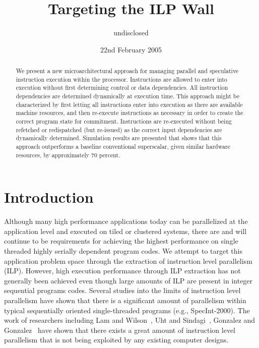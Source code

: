 \documentclass[10pt,dvips]{article}
\begin{document}
%
%
\title{Targeting the ILP Wall}
%
%
\author{
undisclosed
}
%
%
\date{22nd February 2005}
%
\maketitle
%
%
%
\begin{abstract}
%
We present a new microarchitectural approach
for managing parallel and speculative instruction execution
within the processor.  
Instructions are allowed to enter into
execution without first determining control or data dependencies.
All instruction dependencies are 
determined dynamically at execution time.
This approach might be
characterized by first letting all instructions enter
into execution as there are available machine resources,
and then re-execute instructions as necessary in order
to create the correct program state for commitment.
Instructions are re-executed without being refetched or redispatched
(but re-issued)
as the correct input
dependencies are dynamically determined.
Simulation results are presented that shows that this approach
outperforms a baseline conventional superscalar, given similar hardware
resources, by approximately 70 percent.
%
\end{abstract}
%
%
\section{Introduction}
%
Although many high performance applications today
can be parallelized at the application level 
and executed on tiled or clustered systems,
there are and will continue
to be requirements for achieving the highest performance
on single threaded highly serially dependent program codes.
We attempt to target this application problem space
through the extraction of instruction level parallelism (ILP).
However, 
high execution performance through ILP
extraction has not generally been achieved even though
large amounts of ILP are present in integer sequential programs
codes.
Several studies into the limits of instruction level 
parallelism have shown that there is 
a significant amount of parallelism within
typical sequentially oriented single-threaded programs
(e.g., SpecInt-2000).  
The work of researchers including 
Lam and Wilson~\cite{Lam92},
Uht and Sindagi~\cite{Uht95},
Gonzalez and Gonzalez~\cite{Gon97}
have shown that there exists a great amount of instruction level
parallelism that is not being exploited by any existing
computer designs.
\end{document}
